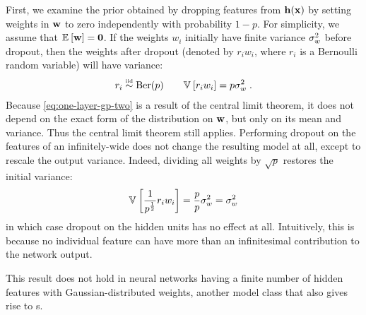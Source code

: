 First, we examine the prior obtained by dropping features from ${\bf{h}}({\bf{x}})$ by setting weights in ${\bf{w}}$ to zero independently with probability $1-p$.
For simplicity, we assume that $\mathbb{E}_{} \left[ {{\bf{w}}} \right] = {\bf{0}}$.
If the weights $w_i$ initially have finite variance $\sigma^2_{w}$ before dropout, then the weights after dropout (denoted by $r_i w_i$, where $r_i$ is a Bernoulli random variable) will have variance:
%
\begin{align}
r_i \overset{\mbox{\tiny iid}}{\sim} \textnormal{Ber}(p) \qquad
\mathbb{V}_{} \left[ {r_i w_i} \right] = p \sigma_{w}^2 \;.
\end{align}
%
Because \cref{eq:one-layer-gp-two} is a result of the central limit theorem, it does not depend on the exact form of the distribution on ${\bf{w}}$, but only on its mean and variance.
Thus the central limit theorem still applies.
Performing dropout on the features of an infinitely-wide \MLP{} does not change the resulting model at all, except to rescale the output variance.
Indeed, dividing all weights by $\sqrt p$ restores the initial variance:
%
\begin{align}
\mathbb{V}_{} \left[ { \frac{1}{p^\frac{1}{2}} r_i w_i} \right] = \frac{p}{p} \sigma_{w}^2 = \sigma_{w}^2
\end{align}
%
in which case dropout on the hidden units has no effect at all.
Intuitively, this is because no individual feature can have more than an infinitesimal contribution to the network output.

This result does not hold in neural networks having a finite number of hidden features with Gaussian-distributed weights, another model class that also gives rise to \gp{}s.



